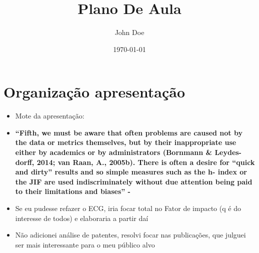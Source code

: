 \documentclass[11pt]{article}
\author{John Doe}
\date{\today}
\title{Plano De Aula}
\begin{document}
\maketitle
\tableofcontents


\section{Organização apresentação}
\label{sec:org4ddc968}
\begin{itemize}
\item Mote da apresentação:
\item \textbf{“Fifth, we must be aware that often problems are caused not by the data or metrics themselves, but by their inappropriate use either by academics or by administrators (Bornmann \& Leydes- dorff, 2014; van Raan, A., 2005b). There is often a desire for  “quick and dirty” results and so simple measures such as the h- index or the JIF are used indiscriminately without due attention being paid to their limitations and biases” - \cite{mingers2015}}
\item Se eu pudesse refazer o ECG, iria focar total no Fator de impacto (q é do interesse de todos) e elaboraria a partir daí
\item Não adicionei análise de patentes, resolvi focar nas publicações, que julguei ser mais interessante para o meu público alvo
\end{itemize}
\end{document}
